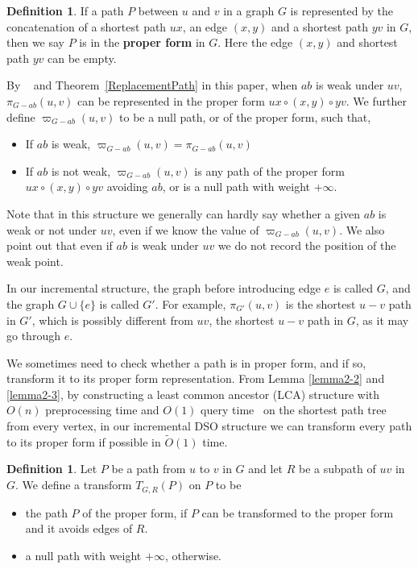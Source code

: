 \documentclass[11pt]{article}
\theoremstyle{plain}
\theoremstyle{definition}
\newtheorem{definition}[theorem]{Definition}
\newcommand{\too}[1]{\tilde{O}({#1})}
\newcommand{\new}[1]{\pi_{G'}(#1)}
\newcommand{\og}[3]{\pi_{G-#3}\left(#1,#2\right)}
\newcommand{\odg}[3]{\varpi_{G-#3}\left(#1,#2\right)}
\begin{document}
\begin{definition}
    If a path $P$ between $u$ and $v$ in a graph $G$ is represented by the concatenation of a shortest path $ux$, an edge $(x,y)$ and a shortest path $yv$ in $G$, then we say $P$ is in the \textbf{proper form} in $G$. Here the edge $(x,y)$ and shortest path $yv$ can be empty.
\end{definition}

By ~\cite{2001Restoration} and Theorem~\ref{ReplacementPath} in this paper, when $ab$ is weak under $uv$, $\og{u}{v}{ab}$ can be represented in the proper form $ux\circ (x,y)\circ yv$.
We further define $\odg{u}{v}{ab}$ to be a null path, or of the proper form, such that,



\begin{itemize}
    \item  If $ab$ is weak, $\odg{u}{v}{ab}=\og{u}{v}{ab}$
    \item If $ab$ is not weak, $\odg{u}{v}{ab}$ is any path of the proper form $ux\circ (x,y)\circ yv$ avoiding $ab$, or is a null path with weight $+\infty.$ 
\end{itemize}

Note that in this structure we generally can hardly say whether a given $ab$ is weak or not under $uv$, even if we know the value of $\odg{u}{v}{ab}$. We also point out that even if $ab$ is weak under $uv$ we do not record the position of the weak point.

In our incremental structure, the graph before introducing edge $e$ is called $G$, and the graph $G\cup \{ e \}$ is called $G'.$  For example, $\new{u, v}$ is the shortest $u-v$ path in $G'$, which is possibly different from $uv$, the shortest $u-v$ path in $G$, as it may go through $e$.

We sometimes need to check whether a path is in proper form, and if so, transform it to its proper form representation. From Lemma \ref{lemma2-2} and \ref{lemma2-3}, by constructing a least common ancestor (LCA) structure with $O(n)$ preprocessing time and $O(1)$ query time~\cite{BF00} on the shortest path tree from every vertex, in our incremental DSO structure we can transform every path to its proper form if possible in $\too{1}$ time.

\begin{definition}
Let $P$ be a path from $u$ to $v$ in $G$ and let $R$ be a subpath of $uv$ in $G$. We define a transform $T_{G,R}(P)$ on $P$ to be
\begin{itemize}
    \item the path $P$ of the proper form, if $P$ can be transformed to the proper form and it avoids edges of $R.$
    \item a null path with weight $+\infty$, otherwise.
\end{itemize}
\end{definition}
\end{document}
